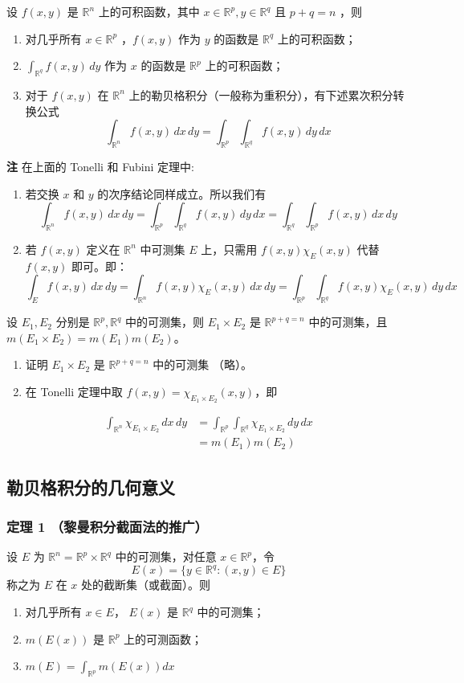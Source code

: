 \documentclass{ctexbook}
\newcommand{\no}{\noindent}
\newcommand{\pro}{\no{\bf 证明：}}
\newcommand{\R}{\mathbb{R}}
\newcommand{\ITEMS}{\begin{enumerate}[leftmargin=4em]}
\newcommand{\ITEME}{\end{enumerate}}
\begin{document}
设 $f(x,y)$ 是 $\R^n$ 上的可积函数，其中 $x\in\R^p,y\in\R^q$ 且 $p+q=n$ ，则
\ITEMS
	\item 对几乎所有 $x\in\R^p$ ，$f(x,y)$ 作为 $y$ 的函数是 $\R^q$ 上的可积函数；
	\item $\int_{\R^q}f(x,y) \,dy$ 作为 $x$ 的函数是 $\R^p$ 上的可积函数；
	\item 对于 $f(x,y)$ 在 $\R^n$ 上的勒贝格积分（一般称为重积分），有下述累次积分转换公式
	\[
	\int_{\R^n} f(x,y)\,dx\,dy = \int_{\R^p}\int_{\R^q} f(x,y)\, dy\, dx
	\]
\ITEME

{\bf 注} 在上面的 Tonelli 和 Fubini 定理中:
\ITEMS
	\item 若交换 $x$ 和 $y$ 的次序结论同样成立。所以我们有
	$$ \int_{\R^n} f(x,y)\,dx\,dy = \int_{\R^p}\int_{\R^q} f(x,y)\, dy\, dx= \int_{\R^q}\int_{\R^p} f(x,y)\, dx\, dy$$
	\item 若 $f(x,y)$ 定义在 $\R^n$ 中可测集 $E$ 上，只需用 $f(x,y)\chi_E(x,y)$ 代替 $f(x,y)$ 即可。即：
	$$\int_{E} f(x,y)\,dx\,dy=\int_{\R^n} f(x,y)\chi_E(x,y)\,dx\,dy = \int_{\R^p}\int_{\R^q} f(x,y)\chi_E(x,y)\, dy\, dx$$
\ITEME

\no{\bf 推论：}

设 $E_1,E_2$ 分别是 $\R^p,\R^q$ 中的可测集，则 $E_1 \times E_2$ 是 $\R^{p+q=n}$ 中的可测集，且 $m(E_1\times E_2) = m(E_1) m(E_2)$。
\pro 
\ITEMS
	\item 证明 $E_1 \times E_2$ 是 $\R^{p+q=n}$ 中的可测集 （略）。
	\item 在 Tonelli 定理中取 $f(x,y)=\chi_{E_1 \times E_2}(x,y)$，即
\ITEME
\[
\begin{aligned}
	\int_{\R^n}\chi_{E_1\times E_2}\, dx\, dy &= \int_{\R^p}\int_{\R^q} \chi_{E_1\times E_2}\, dy\, dx \\
	&= m(E_1) m(E_2)
\end{aligned}
\]

\subsection{勒贝格积分的几何意义}

\subsubsection{定理 1 （黎曼积分截面法的推广）}

设 $E$ 为 $\R^n=\R^p\times \R^q$ 中的可测集，对任意 $x\in \R^p$，令
$$E(x) = \{y\in\R^q:(x,y)\in E\}$$
称之为 $E$ 在 $x$ 处的截断集（或截面）。则
\ITEMS
	\item 对几乎所有 $x\in E$， $E(x)$ 是 $\R^q$ 中的可测集；
	\item $m(E(x))$ 是 $\R^p$ 上的可测函数；
	\item $m(E) = \int_{\R^p} m(E(x)) dx$
\ITEME 
\end{document}
